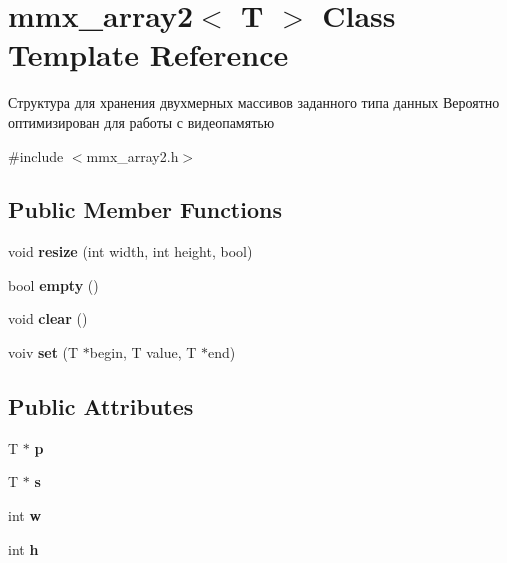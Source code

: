 \hypertarget{classmmx__array2}{\section{mmx\+\_\+array2$<$ T $>$ Class Template Reference}
\label{classmmx__array2}
}


Структура для хранения двухмерных массивов заданного типа данных Вероятно оптимизирован для работы с видеопамятью  




{\ttfamily \#include $<$mmx\+\_\+array2.\+h$>$}

\subsection*{Public Member Functions}
\begin{DoxyCompactItemize}
\item 
\hypertarget{classmmx__array2_ab91171378bb852edb5c539ff9f1b1ba0}{void {\bfseries resize} (int width, int height, bool)}\label{classmmx__array2_ab91171378bb852edb5c539ff9f1b1ba0}

\item 
\hypertarget{classmmx__array2_a5fa7fe8a409091b6d1ae664a80552307}{bool {\bfseries empty} ()}\label{classmmx__array2_a5fa7fe8a409091b6d1ae664a80552307}

\item 
\hypertarget{classmmx__array2_a67c8a4790849f483deb9a7113f78a178}{void {\bfseries clear} ()}\label{classmmx__array2_a67c8a4790849f483deb9a7113f78a178}

\item 
\hypertarget{classmmx__array2_a94c4f955e93cefb4d8cd072669d981bb}{voiv {\bfseries set} (T $\ast$begin, T value, T $\ast$end)}\label{classmmx__array2_a94c4f955e93cefb4d8cd072669d981bb}

\end{DoxyCompactItemize}
\subsection*{Public Attributes}
\begin{DoxyCompactItemize}
\item 
\hypertarget{classmmx__array2_af58c57c4dbbe49a06d90d077498f9a3c}{T $\ast$ {\bfseries p}}\label{classmmx__array2_af58c57c4dbbe49a06d90d077498f9a3c}

\item 
\hypertarget{classmmx__array2_a010e161d462fb8026ed80d00cdbacb57}{T $\ast$ {\bfseries s}}\label{classmmx__array2_a010e161d462fb8026ed80d00cdbacb57}

\item 
\hypertarget{classmmx__array2_aaa57fdc3151aefd7e9019db52310e222}{int {\bfseries w}}\label{classmmx__array2_aaa57fdc3151aefd7e9019db52310e222}

\item 
\hypertarget{classmmx__array2_a5466374e097f5bb0b5999cf25a813155}{int {\bfseries h}}\label{classmmx__array2_a5466374e097f5bb0b5999cf25a813155}

\end{DoxyCompactItemize}


